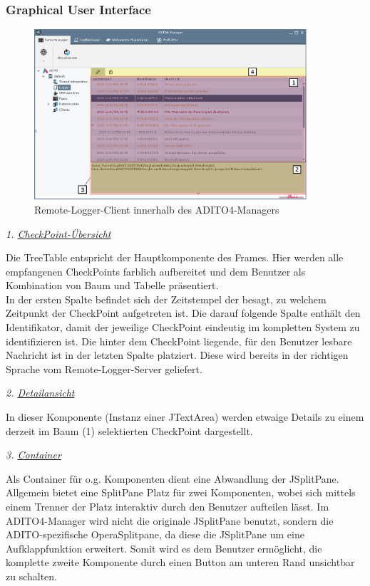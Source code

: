 \subsubsection{Graphical User Interface}
\begin{figure}[h] 
	\begin{center}
		\includegraphics[width=0.9\textwidth]{../img/GUI-Manager.eps}
		\caption{Remote-Logger-Client innerhalb des ADITO4-Managers}
	\end{center}
\end{figure}
\par \textit{1. \underline{CheckPoint-Übersicht}} \vspace{-5px}
\par Die TreeTable entspricht der Hauptkomponente des Frames. Hier werden alle empfangenen CheckPoints farblich aufbereitet und dem Benutzer als Kombination von Baum und Tabelle präsentiert. \\
In der ersten Spalte befindet sich der Zeitstempel der besagt, zu welchem Zeitpunkt der CheckPoint aufgetreten ist. Die darauf folgende Spalte enthält den Identifikator, damit der jeweilige CheckPoint eindeutig im kompletten System zu identifizieren ist. Die hinter dem CheckPoint liegende, für den Benutzer lesbare Nachricht ist in der letzten Spalte platziert. Diese wird bereits in der richtigen Sprache vom Remote-Logger-Server geliefert.

\par \textit{2. \underline{Detailansicht}} \vspace{-5px}
\par In dieser Komponente (Instanz einer JTextArea) werden etwaige Details zu einem derzeit im Baum (1) selektierten CheckPoint dargestellt.

\par \textit{3. \underline{Container}} \vspace{-5px}
\par Als Container für o.g. Komponenten dient eine Abwandlung der JSplitPane. Allgemein bietet eine SplitPane Platz für zwei Komponenten, wobei sich mittels einem Trenner der Platz interaktiv durch den Benutzer aufteilen lässt. Im ADITO4-Manager wird nicht die originale JSplitPane benutzt, sondern die ADITO-spezifische \glqq OperaSplitpane\grqq, da diese die JSplitPane um eine Aufklappfunktion erweitert. Somit wird es dem Benutzer ermöglicht, die komplette zweite Komponente durch einen Button am unteren Rand unsichtbar zu schalten.

